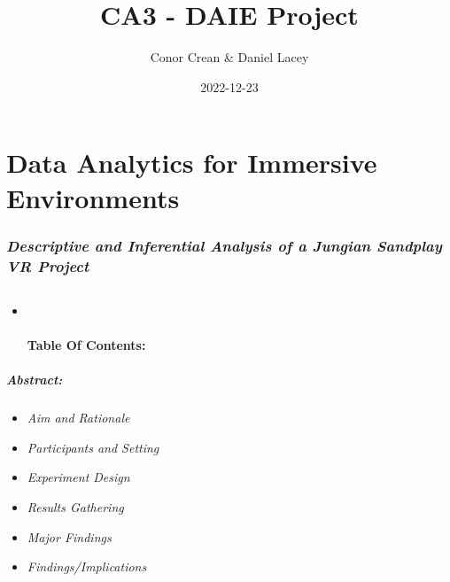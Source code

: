 \documentclass[
]{article}
\title{CA3 - DAIE Project}
\author{Conor Crean \& Daniel Lacey}
\date{2022-12-23}
\providecommand{\tightlist}{%
  \setlength{\itemsep}{0pt}\setlength{\parskip}{0pt}}
\begin{document}
\maketitle

{
\setcounter{tocdepth}{2}
\tableofcontents
}
\newpage

\hypertarget{data-analytics-for-immersive-environments}{%
\section{\texorpdfstring{\textbf{Data Analytics for Immersive
Environments}}{Data Analytics for Immersive Environments}}\label{data-analytics-for-immersive-environments}}

\hypertarget{descriptive-and-inferential-analysis-of-a-jungian-sandplay-vr-project}{%
\subsubsection{\texorpdfstring{\emph{Descriptive and Inferential
Analysis of a Jungian Sandplay VR
Project}}{Descriptive and Inferential Analysis of a Jungian Sandplay VR Project}}\label{descriptive-and-inferential-analysis-of-a-jungian-sandplay-vr-project}}

\hypertarget{section}{%
\subsection{\texorpdfstring{\newpage}{}}\label{section}}

\begin{itemize}
\item ~
  \hypertarget{table-of-contents}{%
  \paragraph{\texorpdfstring{\textbf{Table Of
  Contents:}}{Table Of Contents:}}\label{table-of-contents}}
\end{itemize}

\hypertarget{abstract}{%
\subparagraph{\texorpdfstring{\emph{Abstract:}}{Abstract:}}\label{abstract}}

\begin{itemize}
\tightlist
\item
  \emph{Aim and Rationale}
\item
  \emph{Participants and Setting}
\item
  \emph{Experiment Design}
\item
  \emph{Results Gathering}
\item
  \emph{Major Findings}
\item
  \emph{Findings/Implications}
\end{itemize}
\end{document}
